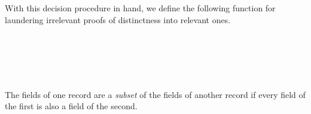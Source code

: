 With this decision procedure in hand, we define the following function
for laundering irrelevant proofs of distinctness into relevant ones.

\begin{fence}
\begin{code}%
\>[0]\AgdaSpace{}%
\AgdaSymbol{:}\AgdaSpace{}%
\AgdaSpace{}%
\AgdaSymbol{\{}\AgdaSymbol{\}\{}\AgdaSpace{}%
\AgdaSymbol{:}\AgdaSpace{}%
\AgdaSpace{}%
\AgdaSpace{}%
\AgdaSymbol{\}}\AgdaSpace{}%
\AgdaSpace{}%
\AgdaSymbol{:}\AgdaSpace{}%
\AgdaSpace{}%
\AgdaSymbol{)}\AgdaSpace{}%
\AgdaSpace{}%
\AgdaSpace{}%
\<%
\\
\>[0]\AgdaSpace{}%
\AgdaSymbol{\{}\AgdaSymbol{\}\{}\AgdaSymbol{\}}\AgdaSpace{}%
\<%
\\
\>[0][@{}l@{\AgdaIndent{0}}]%
\>[4]\AgdaSpace{}%
\AgdaSpace{}%
\<%
\\
\>[0]\AgdaSpace{}%
\AgdaSymbol{|}\AgdaSpace{}%
\AgdaSpace{}%
\AgdaSpace{}%
\AgdaSymbol{=}\AgdaSpace{}%
\<%
\\
\>[0]\AgdaSpace{}%
\AgdaSymbol{|}\AgdaSpace{}%
\AgdaSpace{}%
\AgdaSpace{}%
\AgdaSymbol{=}\AgdaSpace{}%
\AgdaSpace{}%
\AgdaSymbol{(}\AgdaSpace{}%
\AgdaSymbol{)}\<%
\end{code}
\end{fence}

The fields of one record are a \emph{subset} of the fields of another
record if every field of the first is also a field of the second.

\begin{fence}
\begin{code}%
\>[0]\AgdaSpace{}%
\AgdaSymbol{:}\AgdaSpace{}%
\AgdaSpace{}%
\AgdaSymbol{\}}\AgdaSpace{}%
\AgdaSpace{}%
\AgdaSpace{}%
\AgdaSpace{}%
\AgdaSpace{}%
\AgdaSpace{}%
\AgdaSpace{}%
\AgdaSpace{}%
\AgdaSpace{}%
\AgdaSpace{}%
\<%
\\
\>[0]\AgdaSpace{}%
\AgdaSpace{}%
\AgdaSpace{}%
\AgdaSymbol{=}\AgdaSpace{}%
\AgdaSymbol{(}\AgdaSpace{}%
\AgdaSymbol{:}\AgdaSpace{}%
\AgdaSymbol{)}\AgdaSpace{}%
\AgdaSpace{}%
\AgdaSpace{}%
\AgdaSpace{}%
\AgdaSpace{}%
\AgdaSpace{}%
\AgdaSpace{}%
\AgdaSpace{}%
\<%
\end{code}
\end{fence}

